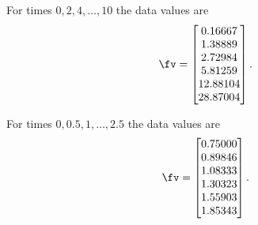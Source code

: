 \begin{exercise}
\begin{Parts}
\item For times \(0,2,4,\ldots,10\) the data values are 
\setbox\ajrqrbox\hbox{}\marginajrbox%
\[ \fv=\begin{bmatrix} 0.16667
\\ 1.38889
\\ 2.72984
\\ 5.81259
\\ 12.88104
\\ 28.87004 \end{bmatrix}.\]
  
\item For times \(0,0.5,1,\ldots,2.5\) the data values are 
\setbox\ajrqrbox\hbox{}\marginajrbox%
\[ \fv=\begin{bmatrix} 0.75000
\\ 0.89846
\\ 1.08333
\\ 1.30323
\\ 1.55903
\\ 1.85343 \end{bmatrix}.\]
  
\end{Parts}
\end{exercise}



